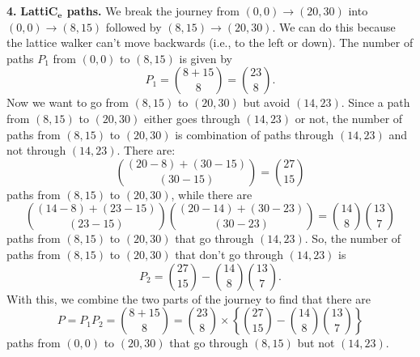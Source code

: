 \documentclass[11pt]{article}
\begin{document}
\noindent \textbf{4.} \textbf{Latti$\mathbf{C_e}$ paths.} We break the journey from $(0,0) \to (20,30)$ into $(0,0) \to (8,15)$ followed by $(8,15)\to (20,30)$. We can do this because the lattice walker can't move backwards (i.e., to the left or down). The number of paths $P_1$ from $(0,0)$ to $(8,15)$ is given by
\begin{equation*}
P_1 = {{8+15}\choose 8} = {23\choose 8}.
\end{equation*}
Now we want to go from $(8,15)$ to $(20,30)$ but avoid $(14,23)$. Since a path from $(8,15)$ to $(20,30)$ either goes through $(14,23)$ or not, the number of paths from $(8,15)$ to $(20,30)$ is combination of paths through $(14,23)$ and not through $(14,23)$. There are:
\begin{equation*}
{ {(20 - 8) + (30-15)} \choose  {(30-15)} } = { {27} \choose  15 }
\end{equation*} 
paths from $(8,15)$ to $(20,30)$, while there are 
\begin{equation*}
{ {(14 - 8) + (23-15)} \choose  {(23-15)} }{ {(20 - 14) + (30-23)} \choose  {(30-23)} } = {14 \choose 8 }{ {13} \choose  7 }
\end{equation*}
paths from $(8,15)$ to $(20,30)$ that go through $(14,23)$. So, the number of paths from $(8,15)$ to $(20,30)$ that don't go through $(14,23)$ is 
\begin{equation*}
P_2 = { {27} \choose  15 } - {14 \choose 8 }{ {13} \choose  7 }.
\end{equation*}
With this, we combine the two parts of the journey to find that there are 
\begin{equation*}
P = P_1 P_2 = {{8+15}\choose 8} = \boxed{{23\choose 8} \times \left\{   { {27} \choose  15 } - {14 \choose 8 }{ {13} \choose  7 }\right\} }
\end{equation*}
paths from $(0,0)$ to $(20,30)$ that go through $(8,15)$ but not $(14,23)$. 




\newpage
\end{document}
